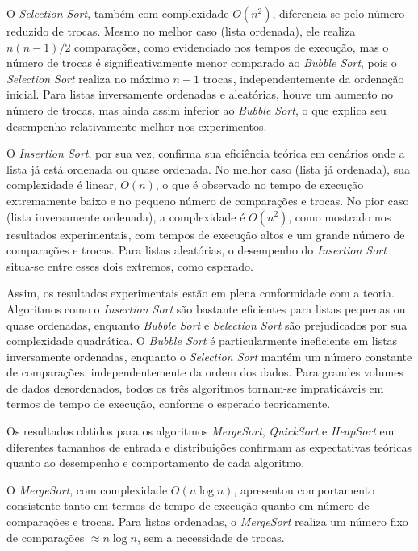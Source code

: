 \documentclass[a4paper,12pt]{article}
\begin{document}
O \textit{Selection Sort}, também com complexidade \( O(n^2) \), diferencia-se pelo número reduzido de trocas. Mesmo no melhor caso (lista ordenada), ele realiza \( n(n-1)/2 \) comparações, como evidenciado nos tempos de execução, mas o número de trocas é significativamente menor comparado ao \textit{Bubble Sort}, pois o \textit{Selection Sort} realiza no máximo \( n-1 \) trocas, independentemente da ordenação inicial. Para listas inversamente ordenadas e aleatórias, houve um aumento no número de trocas, mas ainda assim inferior ao \textit{Bubble Sort}, o que explica seu desempenho relativamente melhor nos experimentos.

O \textit{Insertion Sort}, por sua vez, confirma sua eficiência teórica em cenários onde a lista já está ordenada ou quase ordenada. No melhor caso (lista já ordenada), sua complexidade é linear, \( O(n) \), o que é observado no tempo de execução extremamente baixo e no pequeno número de comparações e trocas. No pior caso (lista inversamente ordenada), a complexidade é \( O(n^2) \), como mostrado nos resultados experimentais, com tempos de execução altos e um grande número de comparações e trocas. Para listas aleatórias, o desempenho do \textit{Insertion Sort} situa-se entre esses dois extremos, como esperado.

Assim, os resultados experimentais estão em plena conformidade com a teoria. Algoritmos como o \textit{Insertion Sort} são bastante eficientes para listas pequenas ou quase ordenadas, enquanto \textit{Bubble Sort} e \textit{Selection Sort} são prejudicados por sua complexidade quadrática. O \textit{Bubble Sort} é particularmente ineficiente em listas inversamente ordenadas, enquanto o \textit{Selection Sort} mantém um número constante de comparações, independentemente da ordem dos dados. Para grandes volumes de dados desordenados, todos os três algoritmos tornam-se impraticáveis em termos de tempo de execução, conforme o esperado teoricamente.

Os resultados obtidos para os algoritmos \textit{MergeSort}, \textit{QuickSort} e \textit{HeapSort} em diferentes tamanhos de entrada e distribuições confirmam as expectativas teóricas quanto ao desempenho e comportamento de cada algoritmo.

O \textit{MergeSort}, com complexidade \( O(n \log n) \), apresentou comportamento consistente tanto em termos de tempo de execução quanto em número de comparações e trocas. Para listas ordenadas, o \textit{MergeSort} realiza um número fixo de comparações \( \approx n \log n \), sem a necessidade de trocas. 
\end{document}
